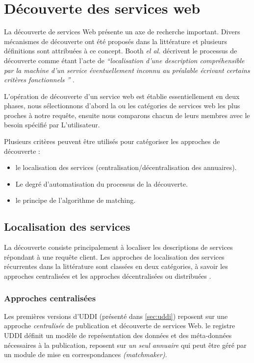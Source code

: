 \section{Découverte des services web}
\label{sec:ws-discovery}
La découverte de services Web présente un axe de recherche
important. Divers mécanismes de découverte ont été proposés dans la
littérature et plusieurs définitions sont attribuées à ce
concept. Booth \textit{el al.}  décrivent le processus de découverte
comme étant l'acte de \textit{``localisation d'une description
  compréhensible par la machine d'un service éventuellement inconnu au
  préalable écrivant certains critères fonctionnels ''}
\cite{booth2004web}.

L'opération de découverte d'un service web est établie essentiellement
en deux phases, nous sélectionnons d'abord la ou les catégories de
services web les plus proches à notre requête, ensuite nous comparons
chacun de leurs membres avec le besoin spécifié par L'utilisateur.

Plusieurs critères peuvent être utilisés pour catégoriser les
approches de découverte \cite{elie2010}:

\begin{itemize}
\item le localisation des services (centralisation/décentralisation
  des annuaires).
\item Le degré d'automatisation du processus de la découverte.
\item le principe de l'algorithme de matching.
\end{itemize}
\newpage
\subsection{Localisation des services}
\label{sec:ws-localisation}

  La découverte consiste principalement à localiser les descriptions
  de services répondant à une requête client. Les approches de
  localisation des services récurrentes dans la littérature sont
  classées en deux catégories, à savoir les approches centralisées et
  les approches décentralisées ou distribuées
  \cite{garofalakis2004web}.

    \subsubsection{Approches centralisées}
    \label{sec:central-disc}

    Les premières versions d'\textsc{UDDI} \cite{clement2004uddi}
    (présenté dans \ref{sec:uddi}) reposent sur une approche
    \textit{centralisée} de publication et découverte de services
    Web. le registre \textsc{UDDI} définit un modèle de représentation
    des données et des méta-données nécessaires à la publication,
    reposent sur \textit{un seul annuaire} qui peut être géré par un
    module de mise en correspondances \textit{(matchmaker)}.

